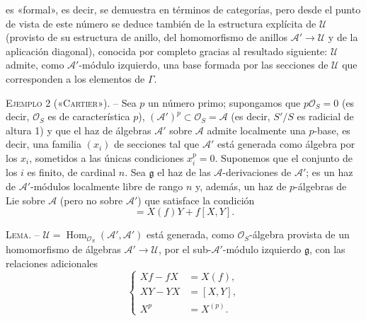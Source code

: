 \documentclass[11pt,twoside,openany]{book}
\numberwithin{equation}{section}
\newcommand{\src}[1]{%
  \phantomsection\hypertarget{src:#1}{}%
  \marginpar{\raggedleft\footnotesize\sffamily #1}%
}
\theoremstyle{plain}
\theoremstyle{definition}
\theoremstyle{remark}
\newcommand{\FgaUnitKey}{frontmatter}
\renewcommand{\src}[1]{%
  \phantomsection\hypertarget{src:\FgaUnitKey:#1}{}%
  \marginpar{\raggedleft\footnotesize\sffamily #1}%
}
\theoremstyle{plain}
\theoremstyle{definition}
\theoremstyle{remark}
\begin{document}
\src{321}
es «formal», es decir, se demuestra en términos de categorías, pero desde el
punto de vista de este número se deduce también de la estructura explícita de
$\mathcal U$ (provisto de su estructura de anillo, del homomorfismo de anillos
$\mathcal A'\longrightarrow\mathcal U$ y de la aplicación diagonal), conocida
por completo gracias al resultado siguiente: $\mathcal U$ admite, como
$\mathcal A'$-módulo izquierdo, una base formada por las secciones de
$\mathcal U$ que corresponden a los elementos de $\Gamma$.

\textsc{Ejemplo 2 («Cartier»).} -- Sea $p$ un número primo; supongamos que
$p\mathcal O_S=0$ (es decir, $\mathcal O_S$ es de característica $p$),
$(\mathcal A')^p\subset\mathcal O_S=\mathcal A$ (es decir, $S'/S$ es radicial
de altura 1) y que el haz de álgebras $\mathcal A'$ sobre $\mathcal A$ admite
localmente una $p$-base, es decir, una familia $(x_i)$ de secciones tal que
$\mathcal A'$ está generada como álgebra por los $x_i$, sometidos a las únicas
condiciones $x_i^p=0$. Suponemos que el conjunto de los $i$ es finito, de
cardinal $n$. Sea $\mathfrak g$ el haz de las $\mathcal A$-derivaciones de
$\mathcal A'$; es un haz de $\mathcal A'$-módulos localmente libre de rango
$n$ y, además, un haz de $p$-álgebras de Lie sobre $\mathcal A$ (pero no sobre
$\mathcal A'$) que satisface la condición
\begin{equation}
  [X,fY]=X(f)Y+f[X,Y].
  \tag{3.5}
\end{equation}

\textsc{Lema.} -- $\mathcal U=
\operatorname{Hom}_{\mathcal O_S}(\mathcal A',\mathcal A')$ está generada,
como $\mathcal O_S$-álgebra provista de un homomorfismo de álgebras
$\mathcal A'\longrightarrow\mathcal U$, por el sub-$\mathcal A'$-módulo
izquierdo $\mathfrak g$, con las relaciones adicionales
\begin{equation}
  \left\{
  \begin{aligned}
    Xf-fX&=X(f),\\
    XY-YX&=[X,Y],\\
    X^p&=X^{(p)}.
  \end{aligned}
  \right.
  \tag{3.6}
\end{equation}
\end{document}
